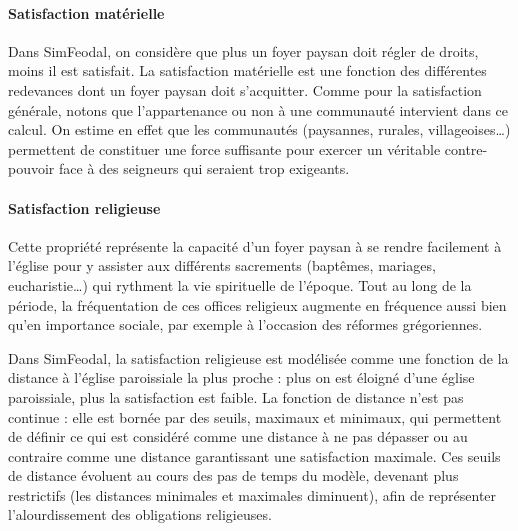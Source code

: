 \paragraph{Satisfaction matérielle} \noindent 
\begin{tcolorbox}[breakable,left=0pt,right=0pt,top=0pt,bottom=0pt,
	colback=gray!15,colframe=gray!15,width=\dimexpr\textwidth\relax, 
	enlarge left by=0mm, boxsep=5pt,arc=0pt,outer arc=0pt]
Dans SimFeodal, on considère que plus un foyer paysan doit régler de droits, moins il est satisfait.
La satisfaction matérielle est une fonction des différentes redevances dont un foyer paysan doit s'acquitter.
Comme pour la satisfaction générale, notons que l'appartenance ou non à une communauté intervient dans ce calcul.
On estime en effet que les communautés (paysannes, rurales, villageoises\ldots) permettent de constituer une force suffisante pour exercer un véritable contre-pouvoir face à des seigneurs qui seraient trop exigeants.
\end{tcolorbox}

\paragraph{Satisfaction religieuse} \noindent 
Cette propriété représente la capacité d'un foyer paysan à se rendre facilement à l'église pour y assister aux différents sacrements (baptêmes, mariages, eucharistie\ldots) qui rythment la vie spirituelle de l'époque.
Tout au long de la période, la fréquentation de ces offices religieux augmente en fréquence aussi bien qu'en importance sociale, par exemple à l'occasion des réformes grégoriennes.
\begin{tcolorbox}[breakable,left=0pt,right=0pt,top=0pt,bottom=0pt,
	colback=gray!15,colframe=gray!15,width=\dimexpr\textwidth\relax, 
	enlarge left by=0mm, boxsep=5pt,arc=0pt,outer arc=0pt]
Dans SimFeodal, la satisfaction religieuse est modélisée comme une fonction de la distance à l'église paroissiale la plus proche : plus on est éloigné d'une église paroissiale, plus la satisfaction est faible.
La fonction de distance n'est pas continue : elle est bornée par des seuils, maximaux et minimaux, qui permettent de définir ce qui est considéré comme une distance à ne pas dépasser ou au contraire comme une distance garantissant une satisfaction maximale.
Ces seuils de distance évoluent au cours des pas de temps du modèle, devenant plus restrictifs (les distances minimales et maximales diminuent), afin de représenter l'alourdissement des obligations religieuses.
\end{tcolorbox}


